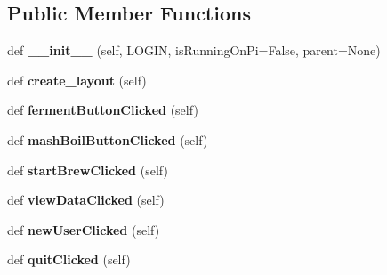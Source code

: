 \subsection*{Public Member Functions}
\begin{DoxyCompactItemize}
\item 
\mbox{\label{classmainwindow_1_1_main_window_a59f1f628b3c9a7ff58686099a1b85586}} 
def {\bfseries \+\_\+\+\_\+init\+\_\+\+\_\+} (self, L\+O\+G\+IN, is\+Running\+On\+Pi=False, parent=None)
\item 
\mbox{\label{classmainwindow_1_1_main_window_a2d54ceded8a8234358f5b4e20fe92c7d}} 
def {\bfseries create\+\_\+layout} (self)
\item 
\mbox{\label{classmainwindow_1_1_main_window_a58db603b330761435f53428d9305cb5b}} 
def {\bfseries ferment\+Button\+Clicked} (self)
\item 
\mbox{\label{classmainwindow_1_1_main_window_aaad4a2de27a3a14f087891c30eec153a}} 
def {\bfseries mash\+Boil\+Button\+Clicked} (self)
\item 
\mbox{\label{classmainwindow_1_1_main_window_afb0ade0369bffba0c44423cab0ebd601}} 
def {\bfseries start\+Brew\+Clicked} (self)
\item 
\mbox{\label{classmainwindow_1_1_main_window_aafd4f238c5a03a1bcf426e0e3d6c58bd}} 
def {\bfseries view\+Data\+Clicked} (self)
\item 
\mbox{\label{classmainwindow_1_1_main_window_a6e3da345b3b5e4cac15541fcdf0d7728}} 
def {\bfseries new\+User\+Clicked} (self)
\item 
\mbox{\label{classmainwindow_1_1_main_window_addee67b210bfa9c1cc5ae98e79cc8bf4}} 
def {\bfseries quit\+Clicked} (self)
\end{DoxyCompactItemize}
